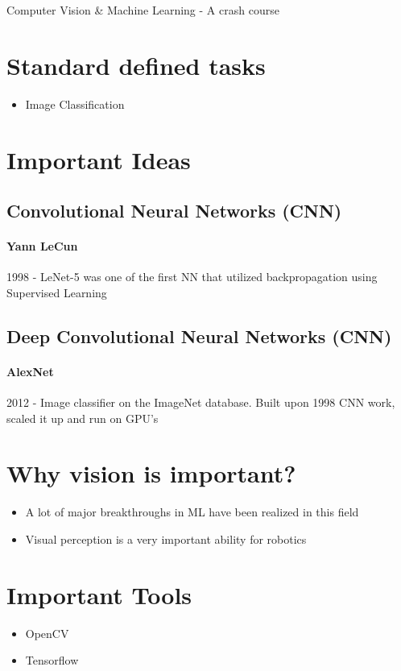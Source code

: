 \documentclass{article}
\begin{document}
	Computer Vision \& Machine Learning - A crash course
	
	\section{Standard defined tasks}
	\begin{itemize}
		\item Image Classification
		
	\end{itemize}
	\section{Important Ideas}
	\subsection{Convolutional Neural Networks (CNN)}
		\paragraph{Yann LeCun}
			1998 - LeNet-5 was one of the first NN that utilized backpropagation using Supervised Learning
			
	\subsection{Deep Convolutional Neural Networks (CNN)}
		\paragraph{AlexNet}
		2012 - Image classifier on the ImageNet database. Built upon 1998 CNN work, scaled it up and run on GPU's 

	\section{Why vision is important?}
	\begin{itemize}
		\item A lot of major breakthroughs in ML have been realized in this field
		\item Visual perception is a very important ability for robotics
	\end{itemize}

	\section{Important Tools}
	\begin{itemize}
		\item OpenCV
		\item Tensorflow
	\end{itemize}
\end{document}
